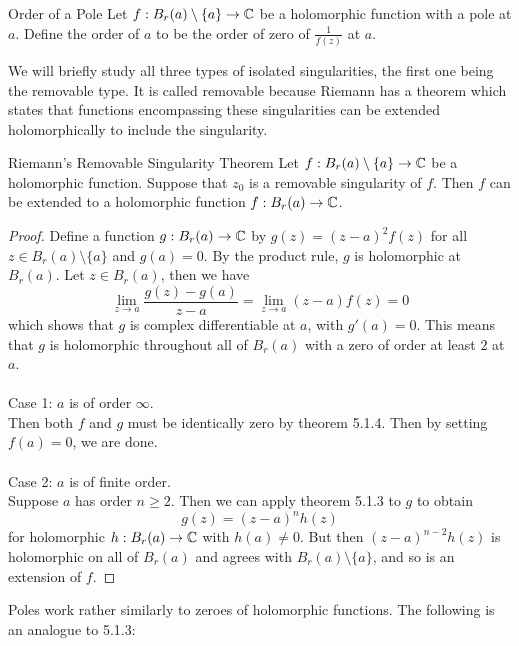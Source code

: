 \documentclass[a4paper]{article}
\begin{document}
\begin{defn}{Order of a Pole}{} Let $f:B_r(a)\setminus\{a\}\to\mathbb{C}$ be a holomorphic function with a pole at $a$. Define the order of $a$ to be the order of zero of $\frac{1}{f(z)}$ at $a$. 
\end{defn}

We will briefly study all three types of isolated singularities, the first one being the removable type. It is called removable because Riemann has a theorem which states that functions encompassing these singularities can be extended holomorphically to include the singularity. 

\begin{thm}{Riemann's Removable Singularity Theorem}{} Let $f:B_r(a)\setminus\{a\}\to\mathbb{C}$ be a holomorphic function. Suppose that $z_0$ is a removable singularity of $f$. Then $f$ can be extended to a holomorphic function $f:B_r(a)\to\mathbb{C}$. \tcbline
\begin{proof}
Define a function $g:B_r(a)\to\mathbb{C}$ by $g(z)=(z-a)^2f(z)$ for all $z\in B_r(a)\setminus\{a\}$ and $g(a)=0$. By the product rule, $g$ is holomorphic at $B_r(a)$. Let $z\in B_r(a)$, then we have $$\lim_{z\to a}\frac{g(z)-g(a)}{z-a}=\lim_{z\to a}(z-a)f(z)=0$$ which shows that $g$ is complex differentiable at $a$, with $g'(a)=0$. This means that $g$ is holomorphic throughout all of $B_r(a)$ with a zero of order at least $2$ at $a$. \\~\\

Case 1: $a$ is of order $\infty$. \\
Then both $f$ and $g$ must be identically zero by theorem 5.1.4. Then by setting $f(a)=0$, we are done. \\~\\

Case 2: $a$ is of finite order. \\
Suppose $a$ has order $n\geq 2$. Then we can apply theorem 5.1.3 to $g$ to obtain $$g(z)=(z-a)^nh(z)$$ for holomorphic $h:B_r(a)\to\mathbb{C}$ with $h(a)\neq 0$. But then $(z-a)^{n-2}h(z)$ is holomorphic on all of $B_r(a)$ and agrees with $B_r(a)\setminus\{a\}$, and so is an extension of $f$. 
\end{proof}
\end{thm}

Poles work rather similarly to zeroes of holomorphic functions. The following is an analogue to 5.1.3: 
\end{document}
